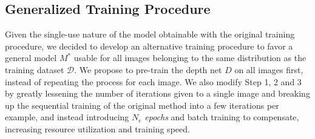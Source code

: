 \subsection{Generalized Training Procedure}
\label{sec:method-general}
Given the single-use nature of the model obtainable with the original training procedure, we decided to develop an alternative training procedure to favor a general model $M^*$ usable for all images belonging to the same distribution as the training dataset $\mathcal{D}$. We propose to pre-train the depth net $D$ on all images first, instead of repeating the process for each image. We also modify Step 1, 2 and 3 by greatly lessening the number of iterations given to a single image and breaking up the sequential training of the original method into a few iterations per example, and instead introducing $N_e$ \textit{epochs} and batch training to compensate, increasing resource utilization and training speed. %
%
%
%
